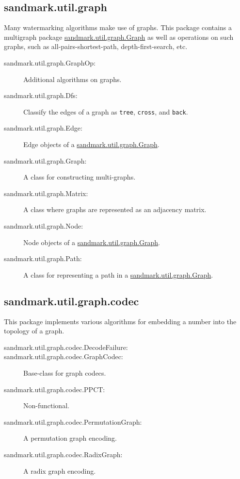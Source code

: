 \subsection{sandmark.util.graph}
Many watermarking algorithms make use of graphs.
This package contains a multigraph package
\url{sandmark.util.graph.Graph} as well as operations
on such graphs, such as all-pairs-shortest-path,
depth-first-search, etc.
\begin{description}
   \item[sandmark.util.graph.GraphOp:]
      Additional algorithms on graphs.
   \item[sandmark.util.graph.Dfs:]
      Classify the edges of a graph as 
      {\tt tree}, {\tt cross}, and {\tt back}.
   \item[sandmark.util.graph.Edge:]
      Edge objects of a \url{sandmark.util.graph.Graph}.
   \item[sandmark.util.graph.Graph:]
      A class for constructing multi-graphs.
   \item[sandmark.util.graph.Matrix:]
      A class where graphs are represented as an adjacency matrix.
   \item[sandmark.util.graph.Node:]
      Node objects of a \url{sandmark.util.graph.Graph}.
   \item[sandmark.util.graph.Path:]
      A class for representing a path in a \url{sandmark.util.graph.Graph}.
\end{description}

\subsection{sandmark.util.graph.codec}
This package implements various algorithms for
embedding a number into the topology of a graph. 
\begin{description}
   \item[sandmark.util.graph.codec.DecodeFailure:]
   \item[sandmark.util.graph.codec.GraphCodec:]
      Base-class for graph codecs.
   \item[sandmark.util.graph.codec.PPCT:]
      Non-functional.
   \item[sandmark.util.graph.codec.PermutationGraph:]
      A permutation graph encoding.
   \item[sandmark.util.graph.codec.RadixGraph:]
      A radix graph encoding.
\end{description}

